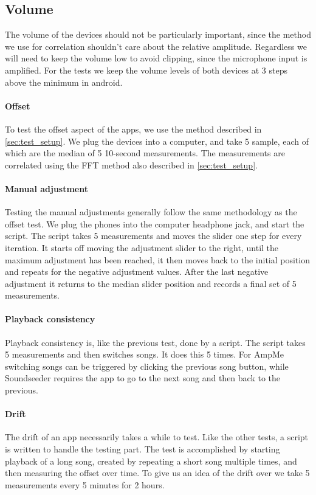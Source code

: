 \subsection{Volume}
The volume of the devices should not be particularly important, since
the method we use for correlation shouldn't care about the relative
amplitude. Regardless we will need to keep the volume low to avoid
clipping, since the microphone input is amplified. For the tests we keep
the volume levels of both devices at 3 steps above the minimum in
android.

\paragraph{Offset}
To test the offset aspect of the apps, we use the method described in
\cref{sec:test_setup}. We plug the devices into a computer, and take
5 sample, each of which are the median of 5 10-second measurements. The
measurements are correlated using the \ac{FFT} method also described in
\cref{sec:test_setup}.

\paragraph{Manual adjustment}
Testing the manual adjustments generally follow the same methodology as
the offset test. We plug the phones into the computer headphone jack,
and start the script. The script takes 5 measurements and moves the
slider one step for every iteration. It starts off moving the adjustment
slider to the right, until the maximum adjustment has been reached, it
then moves back to the initial position and repeats for the negative
adjustment values. After the last negative adjustment it returns to the
median slider position and records a final set of 5 measurements.

\paragraph{Playback consistency}
Playback consistency is, like the previous test, done by a script. The
script takes 5 measurements and then switches songs. It does this
5 times.  For AmpMe switching songs can be triggered by clicking the
previous song button, while Soundseeder requires the app to go to the
next song and then back to the previous.

\paragraph{Drift}
The drift of an app necessarily takes a while to test. Like the other
tests, a script is written to handle the testing part. The test is
accomplished by starting playback of a long song, created by repeating
a short song multiple times, and then measuring the offset over time. To
give us an idea of the drift over we take 5 measurements every 5 minutes
for 2 hours.
